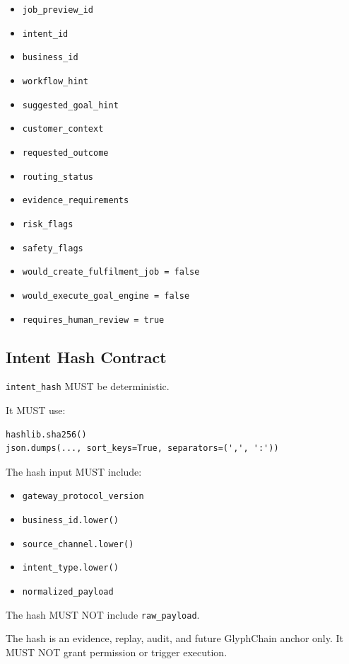\begin{itemize}
  \item \texttt{job\_preview\_id}
  \item \texttt{intent\_id}
  \item \texttt{business\_id}
  \item \texttt{workflow\_hint}
  \item \texttt{suggested\_goal\_hint}
  \item \texttt{customer\_context}
  \item \texttt{requested\_outcome}
  \item \texttt{routing\_status}
  \item \texttt{evidence\_requirements}
  \item \texttt{risk\_flags}
  \item \texttt{safety\_flags}
  \item \texttt{would\_create\_fulfilment\_job = false}
  \item \texttt{would\_execute\_goal\_engine = false}
  \item \texttt{requires\_human\_review = true}
\end{itemize}

\subsection{Intent Hash Contract}

\texttt{intent\_hash} MUST be deterministic.

It MUST use:

\begin{verbatim}
hashlib.sha256()
json.dumps(..., sort_keys=True, separators=(',', ':'))
\end{verbatim}

The hash input MUST include:

\begin{itemize}
  \item \texttt{gateway\_protocol\_version}
  \item \texttt{business\_id.lower()}
  \item \texttt{source\_channel.lower()}
  \item \texttt{intent\_type.lower()}
  \item \texttt{normalized\_payload}
\end{itemize}

The hash MUST NOT include \texttt{raw\_payload}.

The hash is an evidence, replay, audit, and future GlyphChain anchor only. It MUST NOT grant permission or trigger execution.

